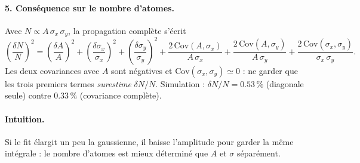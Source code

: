 \documentclass[11pt]{article}
\begin{document}
\paragraph{5. Conséquence sur le nombre d'atomes.}
Avec $N \propto A\,\sigma_x\,\sigma_y$, la propagation complète s'écrit
\begin{equation}
\left(\frac{\delta N}{N}\right)^2 =
\left(\frac{\delta A}{A}\right)^2 + \left(\frac{\delta \sigma_x}{\sigma_x}\right)^2 + \left(\frac{\delta \sigma_y}{\sigma_y}\right)^2
+ \frac{2\,\mathrm{Cov}(A,\sigma_x)}{A\,\sigma_x} + \frac{2\,\mathrm{Cov}(A,\sigma_y)}{A\,\sigma_y} + \frac{2\,\mathrm{Cov}(\sigma_x,\sigma_y)}{\sigma_x\,\sigma_y}.
\end{equation}
Les deux covariances avec $A$ sont négatives et $\mathrm{Cov}(\sigma_x,\sigma_y)\simeq0$ : ne garder que les trois premiers termes \emph{surestime} $\delta N/N$.
Simulation : $\delta N/N = 0.53\,\%$ (diagonale seule) contre $0.33\,\%$ (covariance complète).

\paragraph{Intuition.} Si le fit élargit un peu la gaussienne, il baisse l'amplitude pour garder la même intégrale : le nombre d'atomes est mieux déterminé que $A$ et $\sigma$ séparément.
\end{document}

